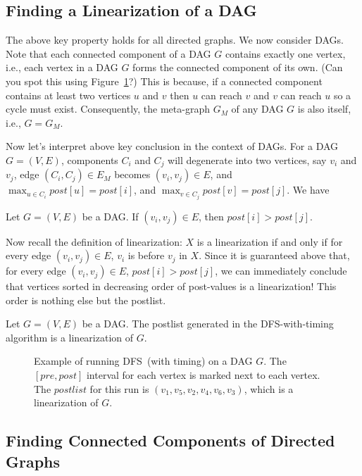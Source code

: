 \subsection*{Finding a Linearization of a DAG}

The above key property holds for all directed graphs.
We now consider DAGs. Note that each connected component of a DAG $G$ contains exactly one vertex, i.e., each vertex in a DAG $G$
forms the connected component of its own. (Can you spot this using Figure~\ref{fig:meta-graph}?)
This is because, if a connected component contains at least two vertices $u$
and $v$ then $u$ can reach $v$ and $v$ can reach $u$ so a cycle must exist.
Consequently, the meta-graph $G_M$ of any DAG $G$ is also itself, i.e., $G= G_M$. %

Now let's interpret above key conclusion in the context of DAGs.
For a DAG $G = (V, E)$, components $C_i$ and $C_j$ will degenerate into two vertices, say $v_i$ and $v_j$,
edge $(C_i, C_j)\in E_M$ becomes $(v_i, v_j)\in E$, and $\max_{u\in C_i} post[u] = post[i]$, and 
$\max_{v\in C_j} post[v] = post[j]$. We have

\begin{corollary}
Let $G = (V, E)$ be a DAG. If $(v_i, v_j)\in E$, then $post[i] > post[j]$.
\end{corollary}

Now recall the definition of linearization: $X$ is a linearization if and only if
for every edge $(v_i, v_j)\in E$, $v_i$ is before $v_j$ in $X$.
Since it is guaranteed above that, 
for every edge $(v_i, v_j)\in E$, $post[i] > post[j]$,
we can immediately conclude that vertices sorted in decreasing order of post-values
is a linearization! This order is nothing else but the postlist.

\begin{corollary}
Let $G = (V, E)$ be a DAG. The postlist generated in the DFS-with-timing algorithm is a linearization of $G$.
\end{corollary}



\begin{figure}[h!]
\centering{}
\caption{Example of running DFS~(with timing) on a DAG $G$. The $[pre,post]$ interval for each vertex
is marked next to each vertex. The $postlist$ for this run is $(v_1, v_5, v_2, v_4, v_6, v_3)$, which is a linearization of $G$.}
\label{fig:meta-graph}
\end{figure}

\subsection*{Finding Connected Components of Directed Graphs}

